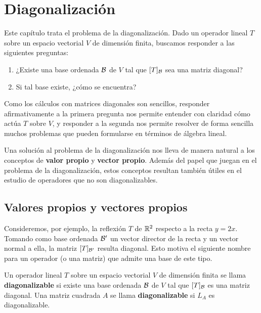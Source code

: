 \documentclass[12pt,a4paper]{book}
\begin{document}
    \setcounter{page}{1}
    \tableofcontents

    \chapter{Diagonalización}

    Este capítulo trata el problema de la diagonalización. Dado un operador lineal $T$ sobre un espacio vectorial $V$ de dimensión finita, buscamos responder a las siguientes preguntas:

    \begin{enumerate}
        \item ¿Existe una base ordenada $\mathcal{B}$ de $V$ tal que $[T]_{\mathcal{B}}$ sea una matriz diagonal?
        \item Si tal base existe, ¿cómo se encuentra?
    \end{enumerate}

    Como los cálculos con matrices diagonales son sencillos, responder afirmativamente a la primera pregunta nos permite entender con claridad cómo actúa $T$ sobre $V$, y responder a la segunda nos permite resolver de forma sencilla muchos problemas que pueden formularse en términos de álgebra lineal.

    Una solución al problema de la diagonalización nos lleva de manera natural a los conceptos de \textbf{valor propio} y \textbf{vector propio}. Además del papel que juegan en el problema de la diagonalización, estos conceptos resultan también útiles en el estudio de operadores que no son diagonalizables.

    \section{Valores propios y vectores propios}

    Consideremos, por ejemplo, la reflexión $T$ de $\mathbb{R}^2$ respecto a la recta $y = 2x$. Tomando como base ordenada $\mathcal{B}'$ un vector director de la recta y un vector normal a ella, la matriz $[T]_{\mathcal{B}'}$ resulta diagonal. Esto motiva el siguiente nombre para un operador (o una matriz) que admite una base de este tipo.

    \begin{definicion}
        Un operador lineal $T$ sobre un espacio vectorial $V$ de dimensión finita se llama \textbf{diagonalizable} si existe una base ordenada $\mathcal{B}$ de $V$ tal que $[T]_{\mathcal{B}}$ es una matriz diagonal. Una matriz cuadrada $A$ se llama \textbf{diagonalizable} si $L_A$ es diagonalizable.
    \end{definicion}
\end{document}
